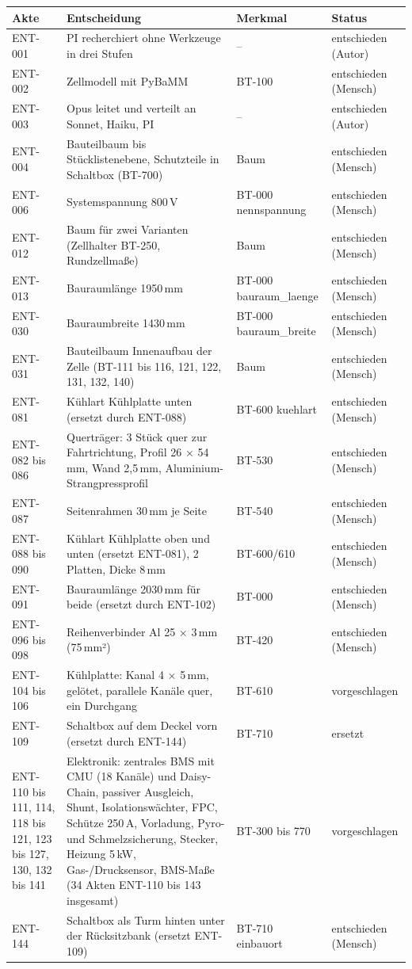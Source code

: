 \documentclass[10pt,a4paper]{article}
\begin{document}
\begin{longtable}{@{}p{1.6cm}p{7.0cm}p{3.8cm}p{2.0cm}@{}}\toprule
\textbf{Akte} & \textbf{Entscheidung} & \textbf{Merkmal} & \textbf{Status}\\\midrule\endhead
ENT-001 & PI recherchiert ohne Werkzeuge in drei Stufen & – & entschieden (Autor)\\
ENT-002 & Zellmodell mit PyBaMM & BT-100 & entschieden (Mensch)\\
ENT-003 & Opus leitet und verteilt an Sonnet, Haiku, PI & – & entschieden (Autor)\\
ENT-004 & Bauteilbaum bis Stücklistenebene, Schutzteile in Schaltbox (BT-700) & Baum & entschieden (Mensch)\\
ENT-006 & Systemspannung 800\,V & BT-000 nennspannung & entschieden (Mensch)\\
ENT-012 & Baum für zwei Varianten (Zellhalter BT-250, Rundzellmaße) & Baum & entschieden (Mensch)\\
ENT-013 & Bauraumlänge 1950\,mm & BT-000 bauraum\_laenge & entschieden (Mensch)\\
ENT-030 & Bauraumbreite 1430\,mm & BT-000 bauraum\_breite & entschieden (Mensch)\\
ENT-031 & Bauteilbaum Innenaufbau der Zelle (BT-111 bis 116, 121, 122, 131, 132, 140) & Baum & entschieden (Mensch)\\
ENT-081 & Kühlart Kühlplatte unten (ersetzt durch ENT-088) & BT-600 kuehlart & entschieden (Mensch)\\
ENT-082 bis 086 & Querträger: 3 Stück quer zur Fahrtrichtung, Profil 26 × 54\,mm, Wand 2,5\,mm, Aluminium-Strangpressprofil & BT-530 & entschieden (Mensch)\\
ENT-087 & Seitenrahmen 30\,mm je Seite & BT-540 & entschieden (Mensch)\\
ENT-088 bis 090 & Kühlart Kühlplatte oben und unten (ersetzt ENT-081), 2 Platten, Dicke 8\,mm & BT-600/610 & entschieden (Mensch)\\
ENT-091 & Bauraumlänge 2030\,mm für beide (ersetzt durch ENT-102) & BT-000 & entschieden (Mensch)\\
ENT-096 bis 098 & Reihenverbinder Al 25 × 3\,mm (75\,mm²) & BT-420 & entschieden (Mensch)\\
ENT-104 bis 106 & Kühlplatte: Kanal 4 × 5\,mm, gelötet, parallele Kanäle quer, ein Durchgang & BT-610 & vorgeschlagen\\
ENT-109 & Schaltbox auf dem Deckel vorn (ersetzt durch ENT-144) & BT-710 & ersetzt\\
ENT-110 bis 111, 114, 118 bis 121, 123 bis 127, 130, 132 bis 141 & Elektronik: zentrales BMS mit CMU (18 Kanäle) und Daisy-Chain, passiver Ausgleich, Shunt, Isolationswächter, FPC, Schütze 250\,A, Vorladung, Pyro- und Schmelzsicherung, Stecker, Heizung 5\,kW, Gas-/Drucksensor, BMS-Maße (34 Akten ENT-110 bis 143 insgesamt) & BT-300 bis 770 & vorgeschlagen\\
ENT-144 & Schaltbox als Turm hinten unter der Rücksitzbank (ersetzt ENT-109) & BT-710 einbauort & entschieden (Mensch)\\\bottomrule
\end{longtable}
\end{document}
